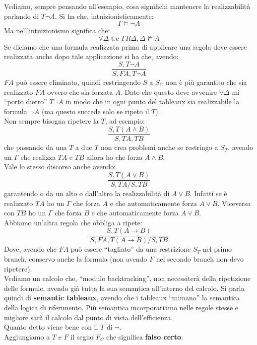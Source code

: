\documentclass[a4paper,12pt, oneside]{book}
\begin{document}
Vediamo, sempre pensando all'esempio, cosa significhi mantenere la
realizzabilità parlando di $T\neg A$. Si ha che, intuizionisticamente:
\[\Gamma\vDash \neg A\]
Ma nell'intuizionismo significa che:
\[\forall\Delta \mbox{ t.c }\Gamma R \Delta, \Delta\nvDash A\]
Se diciamo che una formula realizzata prima di applicare una regola deve essere
realizzata anche dopo tale applicazione si ha che, avendo:
\[\frac{S, T\neg A}{S, FA, T\neg A}\]
$FA$ può essere eliminata, quindi restringendo $S$ a $S_C$ non è più garantito
che sia realizzato $FA$ ovvero che sia forzata $A$. Dato che questo deve
avvenire $\forall\Delta$ mi ``porto dietro'' $T\neg A$ in modo che in ogni punto
del tableaux sia realizzabile la formula $\neg A$ (ma questo succede solo se
ripeto il $T$).\\
Non sempre bisogna ripetere la $T$, ad esempio:
\[\frac{S, T(A\land B)}{S, TA, TB}\]
che passando da una $T$ a due $T$ non crea problemi anche se restringo a
$S_T$, avendo un $\Gamma$ che realizza $TA$ e $TB$ allora ho che forza $A\land
B$.\\
Vale lo stesso discorso anche avendo:    
\[\frac{S, T(A\lor B)}{S, TA/S, TB}\]
garantendo o da un alto o dall'altro la realizzabilità di $A\lor B$. Infatti se
è 
realizzato $TA$ ho un $\Gamma$ che forza $A$ e che automaticamente forza $A\lor
B$. Viceversa con $TB$ ho un $\Gamma$ che forza $B$ e che automaticamente forza
$A\lor B$.\\
Abbiamo un'altra regola che obbliga a ripete:
\[\frac{S, T(A\to B)}{S, FA, T(A\to B)/S, TB}\]
Dove, avendo che $FA$ può essere ``tagliato'' da una restrizione $S_T$ nel primo
branch, conservo anche la formula (non avendo $F$ nel secondo branch non devo
ripetere). \\
Vediamo un calcolo che, ``modulo backtracking'', non necessiterà della
ripetizione delle formule, avendo già tutta la sua semantica all'interno del
calcolo. Si parla quindi di \textbf{semantic tableaux}, avendo che i tableaux
``mimano'' la semantica della logica di riferimento. Più semantica
incorporariamo nelle regole stesse e migliore sarà il calcolo dal punto di vista
dell'efficienza.\\
Quanto detto viene bene con il $T$ di $\neg$.\\
Aggiungiamo a $T$ e $F$ il segno $F_C$ che significa \textbf{falso certo}:
\end{document}
